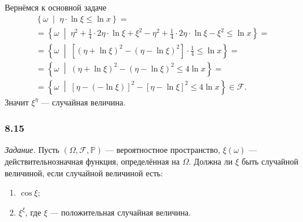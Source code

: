\begin{enumerate}[label=\alph*)]
Вернёмся к основной задаче
\begin{equation*}
\begin{split}
\left\{ \omega \; \middle| \; \eta \cdot \ln \xi \leq \ln x \right\} = \\
= \left\{ \omega \; \middle| \;
\eta^2 + \frac{1}{4} \cdot 2 \eta \cdot \ln \xi + \xi^2 - \eta^2 + \frac{1}{4} \cdot 2 \eta \cdot \ln \xi - \xi^2 \leq \ln x \right\} = \\
= \left\{ \omega \; \middle| \; \left[ \left( \eta + \ln \xi \right)^2 - \left( \eta - \ln \xi \right)^2 \right] \cdot
\frac{1}{4} \leq \ln x \right\} = \\
= \left\{ \omega \; \middle| \; \left( \eta + \ln \xi \right)^2 - \left( \eta - \ln \xi \right)^2 \leq 4 \ln x \right\} = \\
= \left\{ \omega \; \middle| \; \left[ \eta - \left( - \ln \xi \right) \right]^2 -
\left[ \eta - \ln \xi \right]^2 \leq 4 \ln x \right\} \in \mathcal{F}.
\end{split}
\end{equation*}
Значит $ \xi^{ \eta } $ --- случайная величина.
\end{enumerate}

\subsubsection*{8.15}

\textit{Задание.}
Пусть $ \left( \Omega, \mathcal{F}, \mathbb{P} \right) $ ---
вероятностное пространство, $ \xi \left( \omega \right) $ --- действительнозначная функция, определённая на $ \Omega $.
Должна ли $ \xi $ быть случайной величиной, если случайной величиной есть:
\begin{enumerate}[label=\alph*)]
\item $ \cos \xi $;
\item $ \xi^{ \xi } $, где $ \xi $ --- положительная случайная величина.
\end{enumerate}

